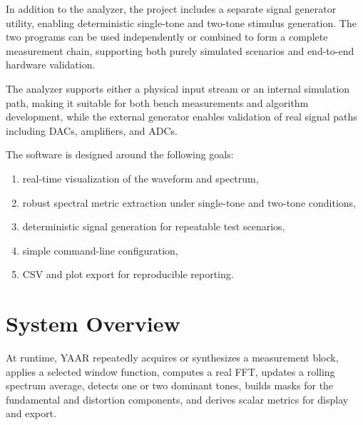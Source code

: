\documentclass[conference]{IEEEtran}
\begin{document}
In addition to the analyzer, the project includes a separate signal generator utility, enabling deterministic single-tone and two-tone stimulus generation. The two programs can be used independently or combined to form a complete measurement chain, supporting both purely simulated scenarios and end-to-end hardware validation.

The analyzer supports either a physical input stream or an internal simulation path, making it suitable for both bench measurements and algorithm development, while the external generator enables validation of real signal paths including DACs, amplifiers, and ADCs.

The software is designed around the following goals:
\begin{enumerate}[leftmargin=*,nosep]
    \item real-time visualization of the waveform and spectrum,
    \item robust spectral metric extraction under single-tone and two-tone conditions,
    \item deterministic signal generation for repeatable test scenarios,
    \item simple command-line configuration,
    \item CSV and plot export for reproducible reporting.
\end{enumerate}

\section{System Overview}
At runtime, YAAR repeatedly acquires or synthesizes a measurement block, applies a selected window function, computes a real FFT, updates a rolling spectrum average, detects one or two dominant tones, builds masks for the fundamental and distortion components, and derives scalar metrics for display and export.
\end{document}
